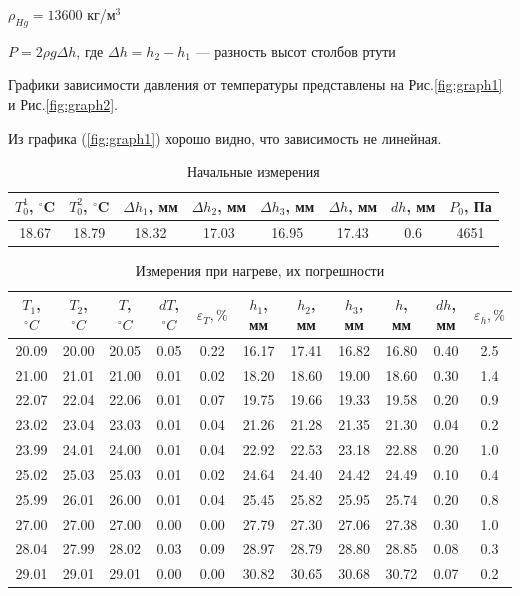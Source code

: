 \documentclass[a4paper,12pt]{article} %
\begin{document}
$\rho_{Hg} = 13600$ кг/м$^3$

$P = 2\rho g\Delta h$, где $\Delta h = h_2 - h_1$ — разность высот столбов ртути

\medskip

Графики зависимости давления от температуры представлены на Рис.\ref{fig:graph1} и Рис.\ref{fig:graph2}.

Из графика (\ref{fig:graph1}) хорошо видно, что зависимость не линейная. 

\begin{table}[h]
    \caption{Начальные измерения}
    \centering
        \begin{tabular}{|c|c|c|c|c|c|c|c|}
    \hline $T_{0}^1$, $^\circ$C & $T_{0}^2$, $^\circ$C & $\Delta h_1$, мм & $\Delta h_2$, мм & $\Delta h_3$, мм & $\Delta h$, мм & $dh$, мм & $P_{0}$, Па  \\
    \hline  18.67 & 18.79 & 18.32 & 17.03 & 16.95 & 17.43 & 0.6 & 4651\\
    \hline
\end{tabular}
    \label{tab:init}
\end{table}

\begin{table}[h]
    \centering
    \begin{tabular}{|c|c|c|c|c|c|c|c|c|c|c|}
        \hline
        $T_1$, $^\circ C$ & $T_2$, $^\circ C$ & $T$, $^\circ C$ & $dT$, $^\circ C$ & $\varepsilon_T, \%$ & $h_1$, мм & $h_2$, мм  & $h_3$, мм  & $h$, мм  & $dh$, мм  & $\varepsilon_h, \%$ \\
        \hline
        20.09 & 20.00 & 20.05 & 0.05 & 0.22 & 16.17 & 17.41 & 16.82 & 16.80 & 0.40 & 2.5 \\
        21.00 & 21.01 & 21.00 & 0.01 & 0.02 & 18.20 & 18.60 & 19.00 & 18.60 & 0.30 & 1.4 \\
        22.07 & 22.04 & 22.06 & 0.01 & 0.07 & 19.75 & 19.66 & 19.33 & 19.58 & 0.20 & 0.9 \\
        23.02 & 23.04 & 23.03 & 0.01 & 0.04 & 21.26 & 21.28 & 21.35 & 21.30 & 0.04 & 0.2 \\
        23.99 & 24.01 & 24.00 & 0.01 & 0.04 & 22.92 & 22.53 & 23.18 & 22.88 & 0.20 & 1.0 \\
        25.02 & 25.03 & 25.03 & 0.01 & 0.02 & 24.64 & 24.40 & 24.42 & 24.49 & 0.10 & 0.4 \\
        25.99 & 26.01 & 26.00 & 0.01 & 0.04 & 25.45 & 25.82 & 25.95 & 25.74 & 0.20 & 0.8 \\
        27.00 & 27.00 & 27.00 & 0.00 & 0.00 & 27.79 & 27.30 & 27.06 & 27.38 & 0.30 & 1.0 \\
        28.04 & 27.99 & 28.02 & 0.03 & 0.09 & 28.97 & 28.79 & 28.80 & 28.85 & 0.08 & 0.3 \\
        29.01 & 29.01 & 29.01 & 0.00 & 0.00 & 30.82 & 30.65 & 30.68 & 30.72 & 0.07 & 0.2 \\
        \hline
    \end{tabular}
    \caption{Измерения при нагреве, их погрешности}
    \label{tab:measurements}
\end{table}
\end{document}
